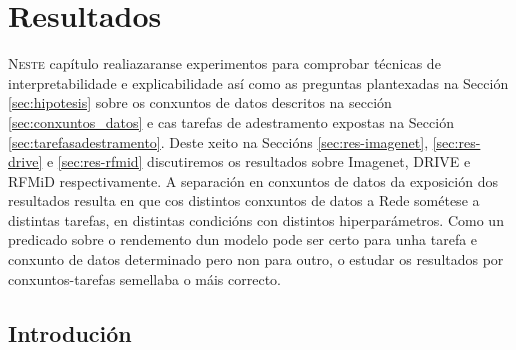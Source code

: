 \chapter{Resultados}
\label{chap:resultados}

\lettrine{N}{este} capítulo realiazaranse experimentos para comprobar técnicas de \gls{interpretabilidade} e \gls{explicabilidade} así como as preguntas plantexadas na Sección \ref{sec:hipotesis} sobre os conxuntos de datos descritos na sección \ref{sec:conxuntos_datos} e cas tarefas de adestramento expostas na Sección \ref{sec:tarefasadestramento}. Deste xeito na Seccións \ref{sec:res-imagenet}, \ref{sec:res-drive} e \ref{sec:res-rfmid} discutiremos os resultados sobre Imagenet, DRIVE e RFMiD respectivamente. A separación en conxuntos de datos da exposición dos resultados resulta en que cos distintos conxuntos de datos a Rede sométese a distintas tarefas, en distintas condicións con distintos hiperparámetros. Como un predicado sobre o rendemento dun modelo pode ser certo para unha tarefa e conxunto de datos determinado pero non para outro, o estudar os resultados por conxuntos-tarefas semellaba o máis correcto.


\section{Introdución}

\begin{table}[H]
\centering
{}
\caption[Combinacións sometidas a experimentación.]{Combinacións sometidas a experimentación. Cada celda representa unha arquitectura (ver Táboa \ref{tab:combinacions}).}
\label{tab:combinacions_exp}
\end{table}

